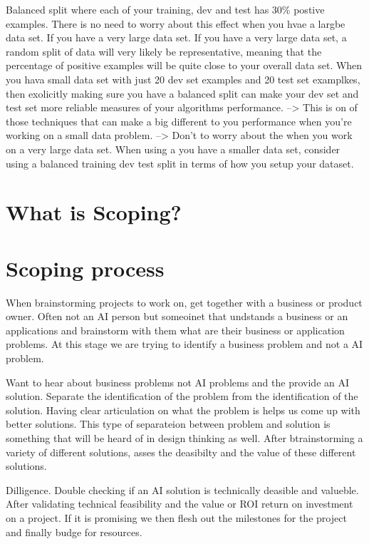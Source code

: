 Balanced split where each of your training, dev and test has 30\% postive examples.
There is no need to worry about this effect when you hvae a largbe data set.
If you have a very large data set.
If you have a very large data set, a random split of data will very likely be representative, meaning that the percentage of positive examples will be quite close to your overall data set.
When you hava small data set with just 20 dev set examples and 20 test set examplkes, then exolicitly making sure you have a balanced split can make your dev set and test set more reliable measures of your algorithms performance.
--> This is on of those techniques that can make a big different to you performance when you're working on a small data problem.
--> Don't to worry about the when you work on a very large data set.
When using a you have a smaller data set, consider using a balanced training dev test split in terms of how you setup your dataset.

\section{What is Scoping?}

\section{Scoping process}

When brainstorming projects to work on, get together with a business or product owner.
Often not an AI person but someoinet that undstands a business or an applications and brainstorm with them what are their business or application problems.
At this stage we are trying to identify a business problem and not a AI problem.

Want to hear about business problems not AI problems and the provide an AI solution.
Separate the identification of the problem from the identification of the solution.
Having clear articulation on what the problem is helps us come up with better solutions.
This type of separateion between problem and solution is something that will be heard of in design thinking as well.
After btrainstorming a variety of different solutions, asses the deasibilty and the value of these different solutions.

Dilligence. Double checking if an AI solution is technically deasible and valueble.
After validating technical feasibility and the value or ROI return on investment on a project.
If it is promising we then flesh out the milestones for the project and finally budge for resources.

